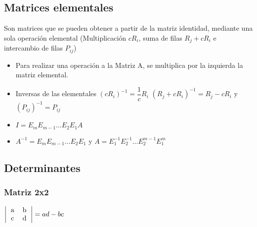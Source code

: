 \subsection{Matrices elementales}
Son matrices que se pueden obtener a partir de la matriz identidad, mediante una sola operación elemental (Multiplicación $cR_i$, suma de filas $R_j+cR_i$ e intercambio de filas $P_{ij}$)

\begin{itemize}
	\item Para realizar una operación a la Matriz A, se multiplica por la izquierda la matriz elemental.
	\item Inversas de las elementales $(cR_i)^{-1}=\dfrac{1}{c}R_i$ $(R_j+cR_i)^{-1}=R_j-cR_i$ y $(P_{ij})^{-1}=P_{ij}$
	\item $I=E_mE_{m-1}\dots E_{2}E_1A$ 
	\item $A^{-1}=E_mE_{m-1}\dots E_{2}E_1$ y $A=E_1^{-1}E_{2}^{-1}\dots E_2^{m-1}E_1^{m}$
\end{itemize}

\subsection{Determinantes}
\subsubsection{Matriz 2x2}

$
\left|\begin{tabular}{ccc}
	a & b \\
	c & d
\end{tabular}\right|=ad-bc
$

